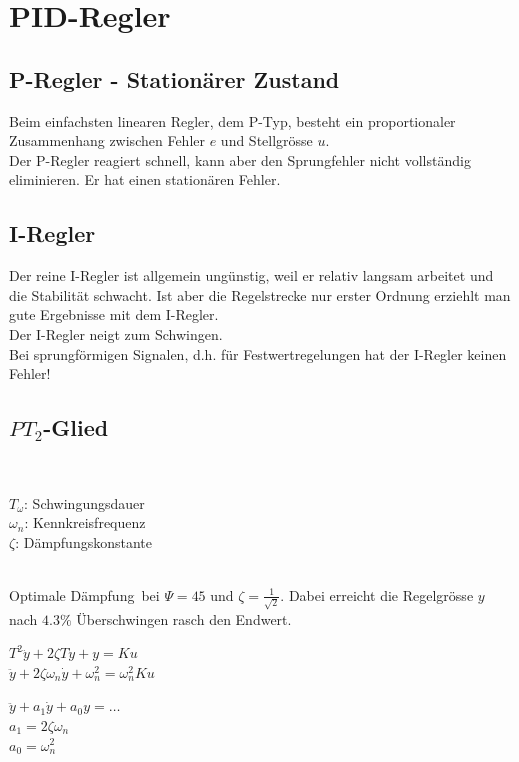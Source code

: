 \section{PID-Regler }

	\subsection{P-Regler - Stationärer Zustand }
		Beim einfachsten linearen Regler, dem P-Typ, besteht ein proportionaler
		Zusammenhang zwischen Fehler $e$ und Stellgrösse $u$.\\
		Der P-Regler reagiert schnell, kann aber den Sprungfehler nicht vollständig
		eliminieren. Er hat einen stationären Fehler.
		
	
	\subsection{I-Regler }
		Der reine I-Regler ist allgemein ungünstig, weil er relativ langsam arbeitet
		und die Stabilität schwacht. Ist aber die Regelstrecke nur erster Ordnung
		erziehlt man gute Ergebnisse mit dem I-Regler.\\
		Der I-Regler neigt zum Schwingen.\\
		Bei sprungförmigen Signalen, d.h. für Festwertregelungen hat der I-Regler
		keinen Fehler!
		
	
	\subsection{$PT_2$-Glied }
		\begin{minipage}{5cm}
        \\
        \end{minipage}
		\begin{minipage}{13cm}
        $T_\omega$: Schwingungsdauer\\
        $\omega_n$: Kennkreisfrequenz\\
        $\zeta$: \hspace{1.1mm} Dämpfungskonstante\\
        \end{minipage}\\
		\glqq Optimale Dämpfung\grqq\ bei $\Psi=45$ und $\zeta=\frac{1}{\sqrt{2}}$.
		Dabei erreicht die Regelgrösse $y$ nach $4.3\%$ Überschwingen rasch den
		Endwert.\\
		\begin{minipage}{7cm}
		$T^2\ddot{y}+2\zeta T \dot{y}+ y=Ku$\\
		$\ddot{y}+2\zeta\omega_n\dot{y}+\omega_n^2=\omega_n^2 Ku$
		\end{minipage}
		\begin{minipage}{11cm}
        $\ddot{y}+a_1\dot{y}+a_0 y=\ldots$\\
        $a_1=2\zeta\omega_n$\\
        $a_0=\omega_n^2$
        \end{minipage}
	
